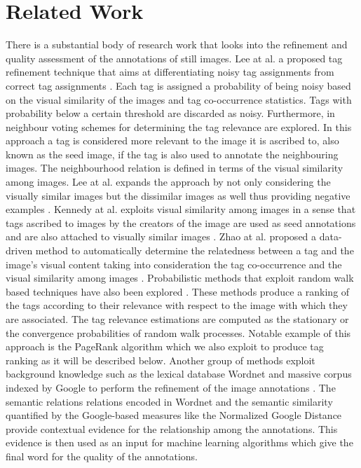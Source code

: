\section{Related Work}\label{sec:filter:rel-work}
There is a substantial body of research work that looks into the refinement and quality assessment of the annotations of still images. Lee at al. a proposed tag refinement technique that aims at
differentiating noisy tag assignments from correct tag assignments \cite{Lee:2010:TRI:1890924.1891010}. Each tag is assigned a probability of being noisy based on the visual similarity of the images and tag co-occurrence statistics. Tags with probability below a certain threshold are discarded as noisy. 
Furthermore, in \cite{Truong:2012:CSK:2324796.2324808,Li:2008:LTR:1460096.1460126} neighbour voting schemes for determining the tag relevance are explored. In this approach a tag is considered more relevant to the image it is ascribed to, also known as the seed image, if the tag is also used to annotate the neighbouring images. The neighbourhood relation is defined in terms of the visual similarity among images. Lee at al. expands the approach by not only considering the visually similar images but the dissimilar images as well thus providing negative examples \cite{Lee:2012:TDE:2390876.2390880}. Kennedy at al. exploits visual similarity among images in a sense that tags ascribed to images by the creators of the image are used as seed annotations and are also attached to visually similar images \cite{Kennedy:2009:RTU:1631135.1631139}. Zhao at al. proposed a data-driven method to automatically determine the relatedness between a tag and the image's visual content taking into consideration the tag co-occurrence  and the visual similarity among images \cite{Zhao:2010:TRV:2174490.2174571}.
Probabilistic methods that exploit random walk based techniques have also been explored \cite{Wang:2006:IAR:1180639.1180774,Liu:2009:TR:1526709.1526757,Li:2012:TRP:2382336.2382380}. These methods produce a ranking of the tags according to their relevance with respect to the image with which they are associated. The tag relevance estimations are computed as the stationary or the convergence probabilities of  random walk processes. Notable example of this approach is the PageRank algorithm \cite{journals/corr/abs-1012-4872,10.4137/GRSB.S702,junker2008analysis} which we also exploit to produce tag ranking as it will be described below. Another group of methods exploit background knowledge such as the lexical database Wordnet and massive corpus indexed by Google to perform the refinement of the image annotations \cite{Jin:2010:KBI:1731523.1731529,Wang:2007:RIA:1282280.1282343}. The semantic relations relations encoded in Wordnet and the semantic similarity quantified by the Google-based measures like the Normalized Google Distance \cite{DBLP:journals/corr/abs-cs-0412098} provide contextual evidence for the relationship among the annotations. This evidence is then used as an input for machine learning algorithms which give the final word for the quality of the annotations. 

